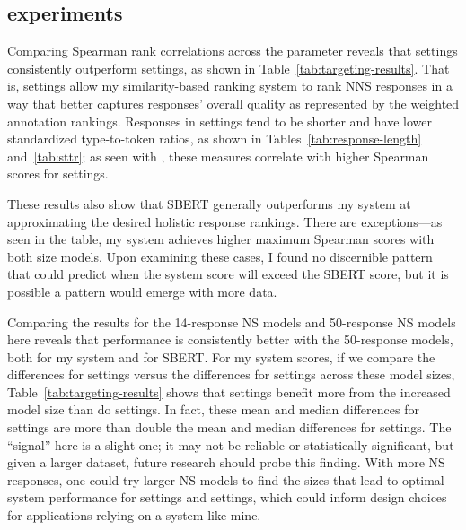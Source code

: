 \subsection{ experiments}
\label{sec:exp-targeting}

Comparing Spearman rank correlations across the  parameter reveals that  settings consistently outperform  settings, as shown in Table~\ref{tab:targeting-results}. That is,  settings allow my similarity-based ranking system to rank NNS responses in a way that better captures responses' overall quality as represented by the weighted annotation rankings. Responses in  settings tend to be shorter and have lower standardized type-to-token ratios, as shown in Tables~\ref{tab:response-length} and~\ref{tab:sttr}; as seen with , these measures correlate with higher Spearman scores for  settings.

These results also show that SBERT generally outperforms my system at approximating the desired holistic response rankings. There are exceptions---as seen in the table, my system achieves higher maximum Spearman scores with both size models. Upon examining these cases, I found no discernible pattern that could predict when the system score will exceed the SBERT score, but it is possible a pattern would emerge with more data.

Comparing the results for the 14-response NS models and 50-response NS models here reveals that performance is consistently better with the 50-response models, both for my system and for SBERT. For my system scores, if we compare the differences for  settings versus the differences for  settings across these model sizes, Table~\ref{tab:targeting-results} shows that  settings benefit more from the increased model size than do  settings. In fact, these mean and median differences for  settings are more than double the mean and median differences for  settings. The ``signal'' here is a slight one; it may not be reliable or statistically significant, but given a larger dataset, future research should probe this finding. With more NS responses, one could try larger NS models to find the sizes that lead to optimal system performance for  settings and  settings, which could inform design choices for applications relying on a system like mine.

